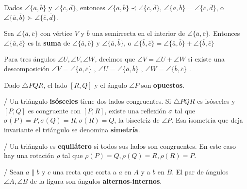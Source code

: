  Dados  $\angle \{\overline{a}, \overline{b} \}$ y  $\angle \{\overline{c}, \overline{d} \}$, entonces  $\angle \{\overline{a}, \overline{b}\} \prec \angle \{\overline{c}, \overline{d} \}$,  $\angle \{\overline{a}, \overline{b}\} = \angle \{\overline{c}, \overline{d} \}$, o  $\angle \{\overline{a}, \overline{b}\} \succ \angle \{\overline{c}, \overline{d} \}$.

 Sea  $\angle \{\overline{a}, \overline{c} \}$ con vértice $V$ y $\overline{b}$ una semirrecta en el interior de $\angle \{\overline{a}, \overline{c} \}$. Entonces $\angle \{\overline{a}, \overline{c} \}$ es la \textbf{suma} de $\angle \{\overline{a}, \overline{c} \}$ y $\angle \{\overline{a}, \overline{b} \}$, o $\angle \{\overline{b}, \overline{c} \}=\angle \{\overline{a}, \overline{b} \}+\angle \{\overline{b}, \overline{c} \}$

 Para tres ángulos $\angle U, \angle V, \angle W$, decimos que $\angle V = \angle U  + \angle W$ si existe una descomposición $\angle V = \angle \{\overline{a}, \overline{c} \}$ ,  $\angle U = \angle \{\overline{a}, \overline{b} \}$ ,  $\angle W = \angle \{\overline{b}, \overline{c} \}$ .

 Dado $\triangle PQR$, el lado $[R, Q]$ y el ángulo $\angle P$ son \textbf{opuestos}.

 /  Un triángulo \textbf{isósceles} tiene dos lados congruentes. Si $\triangle PQR$ es isósceles y $[P,Q]$ es congruente con $[P,R]$, existe una reflexión $\sigma$ tal que $\sigma(P) = P, \sigma(Q) = R, \sigma(R) = Q$, la bisectriz de $\angle P$. Esa isometría que deja invariante el triángulo se denomina \textbf{simetría}.

 /  Un triángulo es \textbf{equilátero} si todos sus lados son congruentes. En este caso hay una rotación $\rho$ tal que $\rho(P) = Q, \rho(Q) = R, \rho(R) = P$.

 / \tma Sean $a \parallel b$ y $c$ una recta que corta a $a$ en $A$ y a $b$ en $B$. El par de ángulos $\angle A, \angle B$ de la figura son ángulos \textbf{alternos-internos}.








